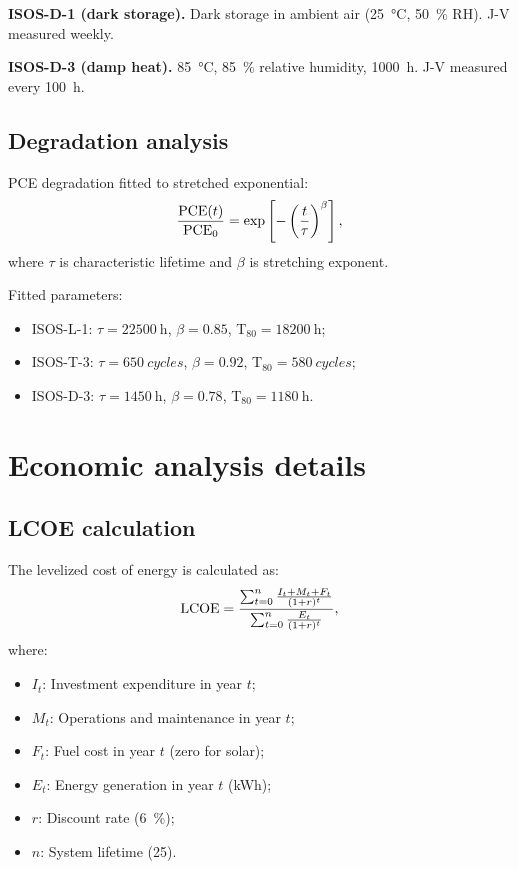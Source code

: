 \documentclass[11pt,a4paper]{article}
\begin{document}
\textbf{ISOS-D-1 (dark storage).} Dark storage in ambient air (\SI{25}{\degreeCelsius}, \SI{50}{\percent} RH). J-V measured weekly.

\textbf{ISOS-D-3 (damp heat).} \SI{85}{\degreeCelsius}, \SI{85}{\percent} relative humidity, \SI{1000}{\hour}. J-V measured every \SI{100}{\hour}.

\subsection{Degradation analysis}

PCE degradation fitted to stretched exponential:
\begin{equation}
\frac{{\rm PCE}(t)}{{\rm PCE}_0} = \exp\left[-\left(\frac{t}{\tau}\right)^\beta\right],
\end{equation}
where $\tau$ is characteristic lifetime and $\beta$ is stretching exponent.

Fitted parameters:
\begin{itemize}
    \item ISOS-L-1: $\tau = \SI{22500}{\hour}$, $\beta = 0.85$, T$_{80} = \SI{18200}{\hour}$;
    \item ISOS-T-3: $\tau = \SI{650}{cycles}$, $\beta = 0.92$, T$_{80} = \SI{580}{cycles}$;
    \item ISOS-D-3: $\tau = \SI{1450}{\hour}$, $\beta = 0.78$, T$_{80} = \SI{1180}{\hour}$.
\end{itemize}

\section{Economic analysis details}\label{si:economics}

\subsection{LCOE calculation}

The levelized cost of energy is calculated as:
\begin{equation}
{\rm LCOE} = \frac{\sum_{t=0}^{n} \frac{I_t + M_t + F_t}{(1+r)^t}}{\sum_{t=0}^{n} \frac{E_t}{(1+r)^t}},
\end{equation}
where:
\begin{itemize}
    \item $I_t$: Investment expenditure in year $t$;
    \item $M_t$: Operations and maintenance in year $t$;
    \item $F_t$: Fuel cost in year $t$ (zero for solar);
    \item $E_t$: Energy generation in year $t$ (\si{\kWh});
    \item $r$: Discount rate (\SI{6}{\percent});
    \item $n$: System lifetime (\SI{25}{\yr}).
\end{itemize}
\end{document}

